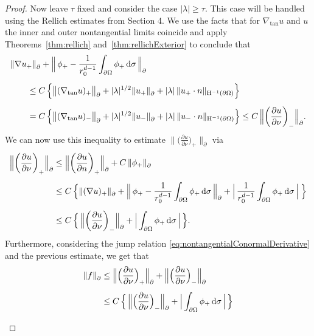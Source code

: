 \begin{proof}
  Now leave $\tau$ fixed and consider the case $|\lambda| \geq \tau$.
  This case will be handled using the Rellich estimates from Section 4.
  We use the facts that for $\nabla_{\mathrm{tan}} u$ and $u$ the inner and outer nontangential limits coincide and apply Theorems~\ref{thm:rellich} and~\ref{thm:rellichExterior} to conclude that
  \begin{align*}
    &\|\nabla u_+ \|^{}_\partial + \Big\| \, \phi_+ - \frac{1}{r_0^{d - 1}}\int_{\partial\Omega} \phi_+ \, {\operatorname{d}\!{\sigma}} \, \Big\|^{}_\partial \\[0.5em]
      &\qquad\leq C\, \Big\{ \big\|( \nabla_{\mathrm{tan}} u)_+ \big\|_\partial^{} + |\lambda|^{1/2} \|u_+\|^{}_\partial + |\lambda|\,  \| u_+\cdot n\|_{\mathrm{H}^{-1}(\partial\Omega)} \Big\} \\[0.5em]
      &\qquad = C\, \Big\{ \big\|( \nabla_{\mathrm{tan}} u)_- \big\|_\partial^{} + |\lambda|^{1/2} \|u_-\|^{}_\partial + |\lambda| \, \| u_-\cdot n\|_{\mathrm{H}^{-1}(\partial\Omega)} \Big\}
      \leq C\, \Big\| \bigg(\frac{\partial u}{\partial \nu} \bigg)_- \Big\|^{}_\partial.
  \end{align*}
  We can now use this inequality to estimate $\| \big( \frac{\partial u}{\partial \nu} \big)_+ \|^{}_\partial$ via
  \begin{align*}
      \Big\| \bigg( \frac{\partial u}{\partial \nu} \bigg)_+ \Big\|^{}_\partial
      &\leq \Big\|\bigg(\frac{\partial u}{\partial n} \bigg)_+ \Big\|^{}_\partial + C\, \| \phi_+ \|^{}_\partial \\[0.5em]
      &\leq C\,  \Big\{  \| (\nabla u)_+ \|^{}_\partial + \Big\|\, \phi_+ - \frac{1}{r_0^{d - 1}} \int_{\partial\Omega} \phi_+ \, {\operatorname{d}\!{\sigma}} \, \Big\|^{}_\partial + \Big| \, \frac{1}{r_0^{d - 1}} \int_{\partial\Omega} \phi_+ \, {\operatorname{d}\!{\sigma}} \, \Big| \; \Big\}\\[0.5em]
      &\leq C\,  \Big\{ \, \Big\| \bigg(\frac{\partial u}{\partial \nu} \bigg)_- \Big\|^{}_\partial + \Big| \int_{\partial\Omega} \phi_+ \, {\operatorname{d}\!{\sigma}} \, \Big|\,\Big\}.
  \end{align*}
  Furthermore, considering the jump relation \eqref{eq:nontangentialConormalDerivative} and the previous estimate, we get that
  \begin{align}
      \|f \|^{}_\partial 
      &\leq \Big\|\Big( \frac{\partial u}{\partial \nu} \Big)_+ \Big\|^{}_\partial + \Big\| \Big( \frac{\partial u}{\partial \nu} \Big)_- \Big\|^{}_\partial  \nonumber\\[0.5em]
      &\leq C \,\Big\{ \,  \Big\| \Big( \frac{\partial u}{\partial \nu} \Big)_- \Big\|^{}_\partial + \Big| \int_{\partial\Omega} \phi_+ \d\sigma \, \Big|\, \Big\} \nonumber\\[0.5em]

\end{align}
\end{proof}
